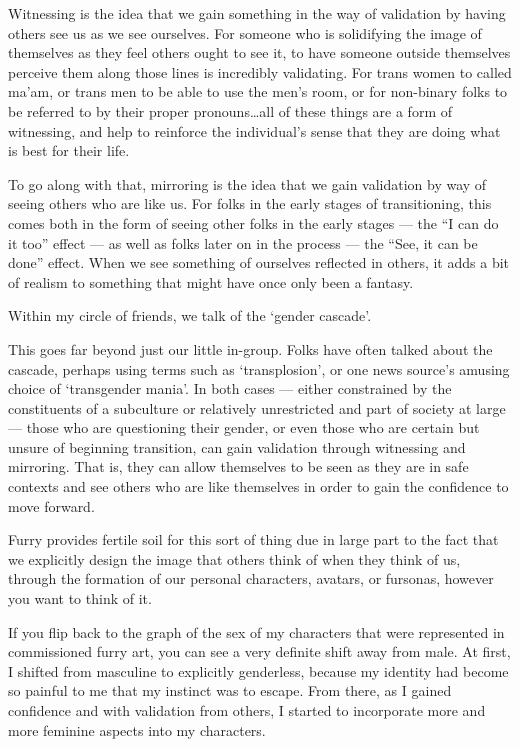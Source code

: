Witnessing is the idea that we gain something in the way of validation by having others see us as we see ourselves.  For someone who is solidifying the image of themselves as they feel others ought to see it, to have someone outside themselves perceive them along those lines is incredibly validating.  For trans women to called ma'am, or trans men to be able to use the men's room, or for non-binary folks to be referred to by their proper pronouns\ldots{}all of these things are a form of witnessing, and help to reinforce the individual's sense that they are doing what is best for their life.

To go along with that, mirroring is the idea that we gain validation by way of seeing others who are like us.  For folks in the early stages of transitioning, this comes both in the form of seeing other folks in the early stages --- the ``I can do it too'' effect --- as well as folks later on in the process --- the ``See, it can be done'' effect.  When we see something of ourselves reflected in others, it adds a bit of realism to something that might have once only been a fantasy.

Within my circle of friends, we talk of the `gender cascade'.

This goes far beyond just our little in-group.  Folks have often talked about the cascade, perhaps using terms such as `transplosion', or one news source's amusing choice of `transgender mania'.  In both cases --- either constrained by the constituents of a subculture or relatively unrestricted and part of society at large --- those who are questioning their gender, or even those who are certain but unsure of beginning transition, can gain validation through witnessing and mirroring.  That is, they can allow themselves to be seen as they are in safe contexts and see others who are like themselves in order to gain the confidence to move forward.

Furry provides fertile soil for this sort of thing due in large part to the fact that we explicitly design the image that others think of when they think of us, through the formation of our personal characters, avatars, or fursonas, however you want to think of it.

If you flip back to the graph of the sex of my characters that were represented in commissioned furry art, you can see a very definite shift away from male.  At first, I shifted from masculine to explicitly genderless, because my identity had become so painful to me that my instinct was to escape.  From there, as I gained confidence and with validation from others, I started to incorporate more and more feminine aspects into my characters.


